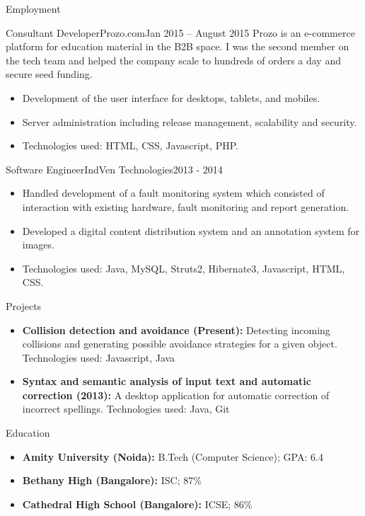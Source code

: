 \documentclass[]{mcdowellcv}
\begin{document}
\begin{cvsection}{Employment}
		\begin{cvsubsection}{Consultant Developer}{Prozo.com}{Jan 2015 – August 2015}
			Prozo is an e-commerce platform for education material in the B2B space. I was the second member on the tech team and helped the company scale to hundreds of orders a day and secure seed funding.	
			\begin{itemize}
				\item Development of the user interface for desktops, tablets, and mobiles.
				\item Server administration including release management, scalability and security.
				\item Technologies used: HTML, CSS, Javascript, PHP.
			\end{itemize}
		\end{cvsubsection}
		
		\begin{cvsubsection}{Software Engineer}{IndVen Technologies}{2013 - 2014}
			\begin{itemize}
				\item Handled development of a fault monitoring system which consisted of interaction with existing hardware, fault monitoring and report generation.
				\item Developed a digital content distribution system and an annotation system for images.
				\item Technologies used: Java, MySQL, Struts2, Hibernate3, Javascript, HTML, CSS.
			\end{itemize}
		\end{cvsubsection}
	\end{cvsection}

	\begin{cvsection}{Projects}
		\begin{cvsubsection}{}{}{}	
			\begin{itemize}
				\item \textbf{Collision detection and avoidance (Present):} Detecting incoming collisions and generating possible avoidance strategies for a given object. Technologies used: Javascript, Java
				\item \textbf{Syntax and semantic analysis of input text and automatic correction (2013):} A desktop application for automatic correction of incorrect spellings. Technologies used: Java, Git
			\end{itemize}
		\end{cvsubsection}
	\end{cvsection}

	\begin{cvsection}{Education}
		\begin{cvsubsection}{}{}{}	
			\begin{itemize}
				\item \textbf{Amity University (Noida):} B.Tech (Computer Science); GPA: 6.4
				\item \textbf{Bethany High (Bangalore):} ISC; 87\%
				\item \textbf{Cathedral High School (Bangalore):} ICSE; 86\%
			\end{itemize}
		\end{cvsubsection}
	\end{cvsection}
	
\end{document}
